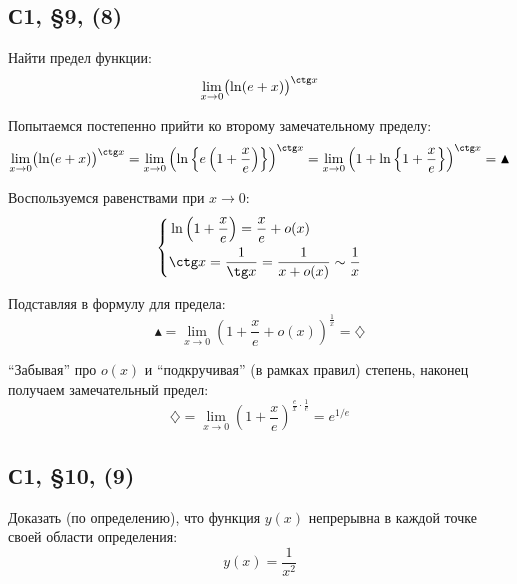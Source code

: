 \documentclass[a4paper,12pt]{article}
\begin{document}



  \subsection{С1, \S 9, (8)}

  Найти предел функции:
  \[
    \lim_{x \to 0} \bigl(\ln(e + x)\bigr)^{\ctg x}
  \]
  
  \begin{solution}
    Попытаемся постепенно прийти ко второму замечательному пределу:
    \[
      \lim_{x \to 0} \bigl(\ln(e + x)\bigr)^{\ctg x}
        = \lim_{x \to 0} \left(\ln\left\{ e \left(1 + \frac{x}{e}\right) \right\}\right)^{\ctg x}
        = \lim_{x \to 0} \left(1 + \ln\left\{1 + \frac{x}{e}\right\}\right)^{\ctg x}
        = \blacktriangle
    \]

    Воспользуемся равенствами при $x \to 0$:
    \[
      \left\{
        \begin{aligned}
          &\ln\left(1 + \frac{x}{e}\right) = \frac{x}{e} + o(x)\\
          &\ctg x = \frac{1}{\tg x} = \frac{1}{x + o(x)} \sim \frac{1}{x}
        \end{aligned}
      \right.
    \]

    Подставляя в формулу для предела:
    \[
      \blacktriangle = \lim_{x \to 0} \left(1 + \frac{x}{e} + o(x)\right)^{\frac{1}{x}} = \diamondsuit
    \]

    ``Забывая'' про $o(x)$ и ``подкручивая'' (в рамках правил) степень, наконец получаем замечательный предел:
    \[
      \diamondsuit = \lim_{x \to 0} \left(1 + \frac{x}{e}\right)^{\frac{e}{x} \cdot \frac{1}{e}}
        = e^{1/e}
    \]
  \end{solution}
 

  \subsection{С1, \S 10, (9)}

  Доказать (по определению), что функция $y(x)$ непрерывна в каждой точке своей области определения:
  \[
    y(x) = \frac{1}{x^2}
  \]
  
\end{document}
